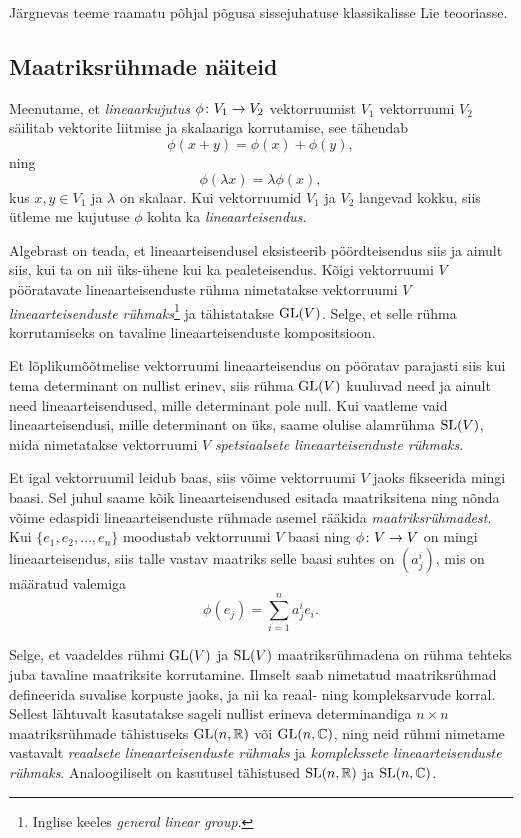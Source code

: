 Järgnevas teeme raamatu \cite{johan1989survey} põhjal põgusa sissejuhatuse
klassikalisse Lie teooriasse. 

\subsection{Maatriksrühmade näiteid}

Meenutame, et \emph{lineaarkujutus}
$\phi \colon V_1 \to V_2$ vektorruumist $V_1$ vektorruumi $V_2$ säilitab
vektorite liitmise ja skalaariga korrutamise, see tähendab
\[ \phi(x + y) = \phi(x) + \phi(y), \]
ning
\[ \phi(\lambda x) = \lambda \phi(x), \]
kus $x, y \in V_1$ ja $\lambda$ on skalaar. Kui vektorruumid $V_1$ ja $V_2$
langevad kokku, siis ütleme me kujutuse $\phi$ kohta ka \emph{lineaarteisendus}.

Algebrast on teada, et lineaarteisendusel eksisteerib pöördteisendus siis ja
ainult siis, kui ta on nii üks-ühene kui ka pealeteisendus. Kõigi vektorruumi $V$
pööratavate lineaarteisenduste rühma nimetatakse vektorruumi $V$
\emph{lineaarteisenduste rühmaks}\footnote{Inglise keeles
\emph{general linear group}.} ja tähistatakse $\operatorname{GL}(V)$. Selge, et selle
rühma korrutamiseks on tavaline lineaarteisenduste kompositsioon.

Et lõplikumõõtmelise vektorruumi lineaarteisendus on pööratav parajasti siis
kui tema determinant on nullist erinev, siis rühma $\operatorname{GL}(V)$ kuuluvad
need ja ainult need lineaarteisendused, mille determinant pole null.
Kui vaatleme vaid lineaarteisendusi, mille determinant on üks, saame olulise
alamrühma $\operatorname{SL}(V)$, mida nimetatakse vektorruumi $V$
\emph{spetsiaalsete lineaarteisenduste rühmaks}.

Et igal vektorruumil leidub baas, siis võime vektorruumi $V$ jaoks
fikseerida mingi baasi. Sel juhul
saame kõik lineaarteisendused esitada maatriksitena ning nõnda võime
edaspidi lineaarteisenduste rühmade asemel rääkida \emph{maatriksrühmadest}.
Kui $\{e_1, e_2, \dots, e_n\}$ moodustab vektorruumi $V$ baasi ning
$\phi \colon V \to V$ on mingi lineaarteisendus, siis talle vastav maatriks
selle baasi suhtes on $(a^i_j)$, mis on määratud valemiga
\[ \phi(e_j) = \sum_{i=1}^{n} a^i_j e_i. \]

Selge, et vaadeldes rühmi $\operatorname{GL}(V)$ ja $\operatorname{SL}(V)$ maatriksrühmadena
on rühma tehteks juba tavaline maatriksite korrutamine. Ilmselt saab
nimetatud maatriksrühmad defineerida suvalise korpuste jaoks, ja nii ka
reaal- ning kompleksarvude korral. Sellest lähtuvalt kasutatakse sageli
nullist erineva determinandiga $n \times n$ maatriksrühmade tähistuseks
$\operatorname{GL}(n, \mathbb{R})$ või $\operatorname{GL}(n, \mathbb{C})$, ning neid rühmi nimetame vastavalt
\emph{reaalsete lineaarteisenduste rühmaks} ja \emph{komplekssete
lineaarteisenduste rühmaks}. Analoogiliselt on kasutusel tähistused
$\operatorname{SL}(n, \mathbb{R})$ ja $\operatorname{SL}(n, \mathbb{C})$.


